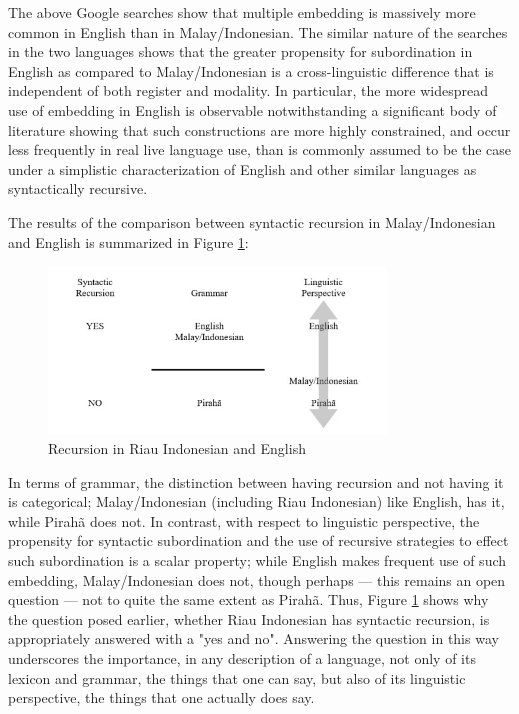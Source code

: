 \documentclass[output=paper,colorlinks,citecolor=brown
]{langscibook}
\begin{document}
The above Google searches show that multiple embedding is massively more common in English than in Malay/Indonesian.  The similar nature of the searches in the two languages shows that the greater propensity for subordination in English as compared to Malay/Indonesian is  a cross-linguistic difference that is independent of both register and modality.  In particular, the more widespread use of embedding in English is observable notwithstanding a significant body of literature \citep{karlsson2007aconstraints,karlsson2007bconstraints,karlsson2009aorigin,karlsson2009bsyntactic} showing that such constructions are more highly constrained, and occur less frequently in real live language use, than is commonly assumed to be the case under a simplistic characterization of English and other similar languages as syntactically recursive.

The results of the comparison between syntactic recursion in Malay/Indonesian and English is summarized in Figure \ref{fig:gil:fig5}:

\begin{figure}
\centering
\includegraphics[width=0.8\textwidth]{gil_figure5.png}
\caption{\label{fig:gil:fig5}Recursion in Riau Indonesian and English}
\end{figure}

In terms of grammar, the distinction between having recursion and not having it is categorical; Malay/Indonesian (including Riau Indonesian) like English, has it, while Pirahã does not.  In contrast, with respect to linguistic perspective, the propensity for syntactic subordination and the use of recursive strategies to effect such subordination is a scalar property; while English makes frequent use of such embedding, Malay/Indonesian does not, though perhaps — this remains an open question — not to quite the same extent as Pirahã.  Thus, Figure \ref{fig:gil:fig5} shows why the question posed earlier, whether Riau Indonesian has syntactic recursion, is appropriately answered with a "yes and no".  Answering the question in this way underscores the importance, in any description of a language, not only of its lexicon and grammar, the things that one can say, but also of its linguistic perspective, the things that one actually does say.
\end{document}
